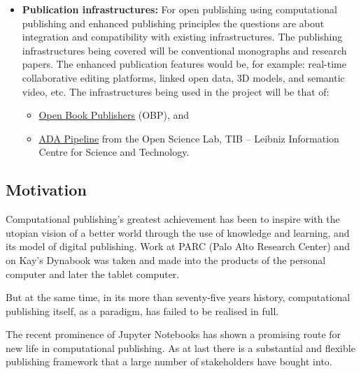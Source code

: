 \documentclass{article}
\begin{document}
\begin{itemize}
\item \textbf{Publication infrastructures:} For open publishing using computational publishing and enhanced publishing principles the questions are about integration and compatibility with existing infrastructures. The publishing infrastructures being covered will be conventional monographs and research papers. The enhanced publication features would be, for example: real-time collaborative editing platforms, linked open data, 3D models, and semantic video, etc. The infrastructures being used in the project will be that of: 

\begin{itemize}
\item \href{https://github.com/OpenBookPublishers}{Open Book Publishers} (OBP), and  


\item \href{https://github.com/TIBHannover/ADA-Reference-Publication}{ADA Pipeline} from the Open Science Lab, TIB – Leibniz Information Centre for Science and Technology.


\end{itemize}

\end{itemize}\addtocounter{footnote}{-2}

\subsection{Motivation}\label{H2831995}



Computational publishing's greatest achievement has been to inspire with the utopian vision of a better world through the use of knowledge and learning, and its model of digital publishing. Work at PARC (Palo Alto Research Center) and on Kay's Dynabook was taken and made into the products of the personal computer and later the tablet computer. 


But at the same time, in its more than seventy-five years history, computational publishing itself, as a paradigm, has failed to be realised in full. 


The recent prominence of Jupyter Notebooks has shown a promising route for new life in  computational publishing. As at last there is a substantial and flexible publishing framework that a large number of stakeholders have bought into.
\end{document}
